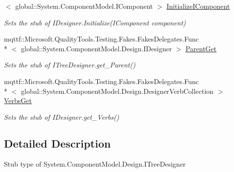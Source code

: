 \begin{DoxyCompactItemize}
$<$ global\-::\-System.\-Component\-Model.\-I\-Component $>$ \hyperlink{class_system_1_1_component_model_1_1_design_1_1_fakes_1_1_stub_i_tree_designer_a246d043327d383c0aba68a161b41ccc1}{Initialize\-I\-Component}
\begin{DoxyCompactList}\small\item\em Sets the stub of I\-Designer.\-Initialize(\-I\-Component component)\end{DoxyCompactList}\item 
mqttf\-::\-Microsoft.\-Quality\-Tools.\-Testing.\-Fakes.\-Fakes\-Delegates.\-Func\\*
$<$ global\-::\-System.\-Component\-Model.\-Design.\-I\-Designer $>$ \hyperlink{class_system_1_1_component_model_1_1_design_1_1_fakes_1_1_stub_i_tree_designer_aa5865e2a0f563a46ed09405cbd4f1d69}{Parent\-Get}
\begin{DoxyCompactList}\small\item\em Sets the stub of I\-Tree\-Designer.\-get\-\_\-\-Parent()\end{DoxyCompactList}\item 
mqttf\-::\-Microsoft.\-Quality\-Tools.\-Testing.\-Fakes.\-Fakes\-Delegates.\-Func\\*
$<$ global\-::\-System.\-Component\-Model.\-Design.\-Designer\-Verb\-Collection $>$ \hyperlink{class_system_1_1_component_model_1_1_design_1_1_fakes_1_1_stub_i_tree_designer_a7e075324f3cf814bb6e627e7b843a2ec}{Verbs\-Get}
\begin{DoxyCompactList}\small\item\em Sets the stub of I\-Designer.\-get\-\_\-\-Verbs()\end{DoxyCompactList}\end{DoxyCompactItemize}


\subsection{Detailed Description}
Stub type of System.\-Component\-Model.\-Design.\-I\-Tree\-Designer



